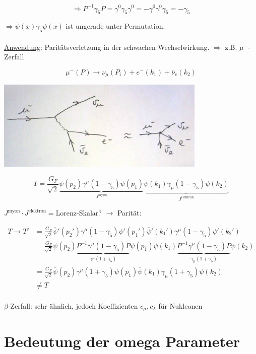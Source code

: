 \[\Rightarrow P^{-1}\gamma_5 P = \gamma^0\gamma_5\gamma^0 = -\gamma^0\gamma^0\gamma_5 = -\gamma_5\]

\(\Rightarrow \overline\psi(x) \gamma_5\psi(x)\) ist ungerade unter Permutation.\\
\\
\underline{Anwendung}: Paritätsverletzung in der schwachen Wechselwirkung. \(\Rightarrow \) z.B. \(\mu^-\)-Zerfall

\[\mu^-(P) \rightarrow \nu_\mu(P_i) + e^-(k_1) + \overline \nu_e(k_2)\]


 \includegraphics[width=0.75\textwidth]{kap06_01.png}




\[T= \frac{G_F}{\sqrt{2}}\underbrace{  \overline\psi(p_2)\gamma^\mu(1-\gamma_5)\psi(p_1)}_{J^{\text{myon}}} \underbrace{\overline\psi(k_1)\gamma_\mu(1-\gamma_5)\psi(k_2)}_{J^{\text{elektron}}}\]


\(J^{\text{myon}}\cdot J^{\text{elektron}} = \text{Lorenz-Skalar?}\) \(\rightarrow \) Parität:

\begin{align}
T\rightarrow T' &=\frac{G_F}{\sqrt{2}} \overline\psi'(p_2')\gamma^\mu(1-\gamma_5) \psi'(p_1')   \overline\psi'(k_1')\gamma^\mu(1-\gamma_5) \psi'(k_2') \\
&=\frac{G_F}{\sqrt{2}} \overline\psi(p_2)\underbrace{P^{-1}\gamma^\mu(1-\gamma_5)P}_{\gamma^\mu (1+\gamma_5)}  \psi(p_1)   \overline\psi(k_1)\underbrace{P^{-1}\gamma^\mu(1-\gamma_5)P}_{\gamma_\mu (1+\gamma_5)} \psi(k_2) \\
&=\frac{G_F}{\sqrt{2}} \overline\psi(p_2)\gamma^\mu (1+\gamma_5) \psi(p_1)   \overline\psi(k_1)\gamma_\mu (1+\gamma_5) \psi(k_2)\\
 &\neq T\\
\end{align}

\(\beta\)-Zerfall: sehr ähnlich, jedoch Koeffizienten \(c_\mu,c_\lambda\) für Nukleonen


\section{Bedeutung der omega Parameter}

